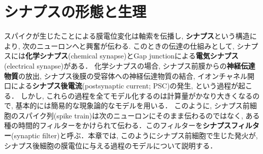 \section{シナプスの形態と生理
}
スパイクが生じたことによる膜電位変化は軸索を伝播し, \textbf{シナプス}という構造により, 次のニューロンへと興奮が伝わる. このときの伝達の仕組みとして, シナプスには\textbf{化学シナプス}(chemical synapse)とGap junctionによる\textbf{電気シナプス}(electrical synapse)がある．  
化学シナプスの場合, シナプス前膜からの\textbf{神経伝達物質}の放出, シナプス後膜の受容体への神経伝達物質の結合, イオンチャネル開口による\textbf{シナプス後電流}(postsynaptic current; PSC)の発生, という過程が起こる．
しかし, これらの過程を全てモデル化するのは計算量がかなり大きくなるので, 基本的には簡易的な現象論的なモデルを用いる．
このように, シナプス前細胞のスパイク列(spike train)は次のニューロンにそのまま伝わるのではなく, ある種の時間的フィルターをかけられて伝わる．このフィルターを\textbf{シナプスフィルター}(synaptic filter)と呼ぶ．本章では, このようにシナプス前細胞で生じた発火が, シナプス後細胞の膜電位に与える過程のモデルについて説明する．
